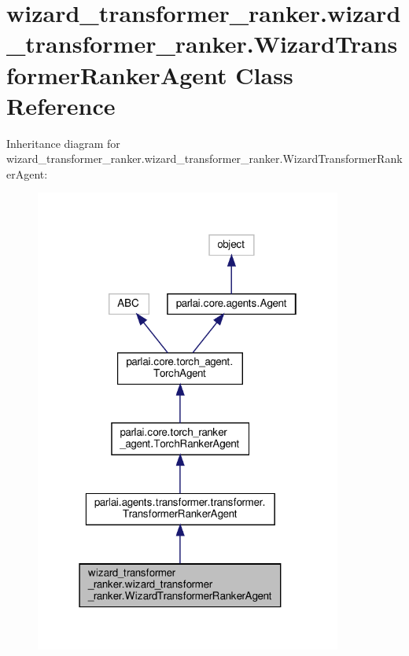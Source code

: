 \hypertarget{classwizard__transformer__ranker_1_1wizard__transformer__ranker_1_1WizardTransformerRankerAgent}{}\section{wizard\+\_\+transformer\+\_\+ranker.\+wizard\+\_\+transformer\+\_\+ranker.\+Wizard\+Transformer\+Ranker\+Agent Class Reference}
\label{classwizard__transformer__ranker_1_1wizard__transformer__ranker_1_1WizardTransformerRankerAgent}


Inheritance diagram for wizard\+\_\+transformer\+\_\+ranker.\+wizard\+\_\+transformer\+\_\+ranker.\+Wizard\+Transformer\+Ranker\+Agent\+:
\nopagebreak
\begin{figure}[H]
\begin{center}
\leavevmode
\includegraphics[width=286pt]{classwizard__transformer__ranker_1_1wizard__transformer__ranker_1_1WizardTransformerRankerAgent__inherit__graph}
\end{center}
\end{figure}



